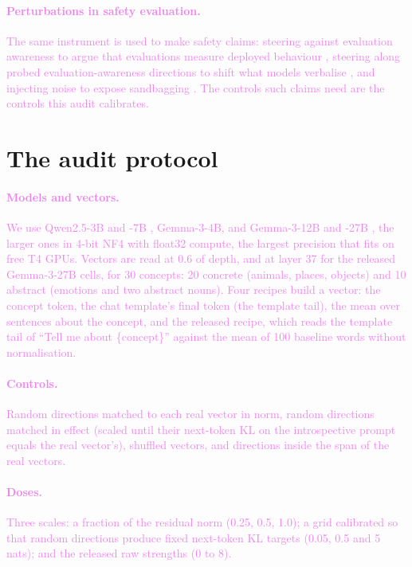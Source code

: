 \documentclass[11pt,a4paper]{article}
\newcommand{\draft}[1]{\textcolor{violet}{#1}}
\begin{document}
\draft{\paragraph{Perturbations in safety evaluation.} The same instrument is used to make safety
claims: steering against evaluation awareness to argue that evaluations measure deployed behaviour
\citep{hua2025steering}, steering along probed evaluation-awareness directions to shift what models
verbalise \citep{heidari2026evalaware}, and injecting noise to expose sandbagging
\citep{tice2024noise}. The controls such claims need are the controls this audit calibrates.}

\section{The audit protocol}
\label{sec:protocol}
\draft{\paragraph{Models and vectors.} We use Qwen2.5-3B and -7B \citep{qwen2025qwen25}, Gemma-3-4B,
and Gemma-3-12B and -27B \citep{gemma2025gemma3}, the larger ones in 4-bit NF4 \citep{dettmers2023qlora}
with float32 compute, the largest precision that fits on free T4 GPUs. Vectors
are read at 0.6 of depth, and at layer 37 for the released Gemma-3-27B cells, for 30 concepts: 20
concrete (animals, places, objects) and 10 abstract (emotions and two abstract nouns). Four recipes
build a vector: the concept token, the chat template's final token (the template tail), the mean
over sentences about the concept, and the released recipe, which reads the template tail of ``Tell
me about \{concept\}'' against the mean of 100 baseline words without normalisation.}

\draft{\paragraph{Controls.} Random directions matched to each real vector in norm, random
directions matched in effect (scaled until their next-token KL on the introspective prompt equals
the real vector's), shuffled vectors, and directions inside the span of the real vectors.}

\draft{\paragraph{Doses.} Three scales: a fraction of the residual norm (0.25, 0.5, 1.0); a grid
calibrated so that random directions produce fixed next-token KL targets (0.05, 0.5 and 5 nats);
and the released raw strengths (0 to 8).}
\end{document}
